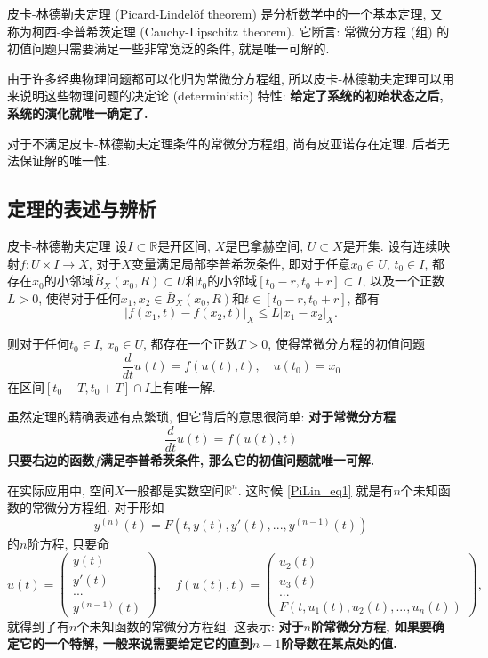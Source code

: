 
皮卡-林德勒夫定理 (Picard-Lindelöf theorem) 是分析数学中的一个基本定理, 又称为柯西-李普希茨定理 (Cauchy-Lipschitz theorem). 它断言: 常微分方程 (组) 的初值问题只需要满足一些非常宽泛的条件, 就是唯一可解的. 

由于许多经典物理问题都可以化归为常微分方程组, 所以皮卡-林德勒夫定理可以用来说明这些物理问题的决定论 (deterministic) 特性: \textbf{给定了系统的初始状态之后, 系统的演化就唯一确定了.}

对于不满足皮卡-林德勒夫定理条件的常微分方程组, 尚有皮亚诺存在定理. 后者无法保证解的唯一性.

\subsection{定理的表述与辨析}
\begin{theorem}{皮卡-林德勒夫定理}
设$I\subset\mathbb{R}$是开区间, $X$是巴拿赫空间, $U\subset X$是开集. 设有连续映射$f:U\times I\to X$, 对于$X$变量满足局部李普希茨条件, 即对于任意$x_0\in U$, $t_0\in I$, 都存在$x_0$的小邻域$\bar B_X(x_0,R)\subset U$和$t_0$的小邻域$[t_0-r,t_0+r]\subset I$, 以及一个正数$L>0$, 使得对于任何$x_1,x_2\in \bar B_X(x_0,R)$和$t\in[t_0-r,t_0+r]$, 都有
$$
|f(x_1,t)-f(x_2,t)|_X\leq L|x_1-x_2|_X.
$$

则对于任何$t_0\in I$, $x_0\in U$, 都存在一个正数$T>0$, 使得常微分方程的初值问题
$$
\frac{d}{dt}u(t)=f(u(t),t),\quad u(t_0)=x_0
$$
在区间$[t_0-T,t_0+T]\cap I$上有唯一解.
\end{theorem}

虽然定理的精确表述有点繁琐, 但它背后的意思很简单: \textbf{对于常微分方程}
\begin{equation}\label{PiLin_eq1}
\frac{d}{dt}u(t)=f(u(t),t)
\end{equation}
\textbf{只要右边的函数$f$满足李普希茨条件, 那么它的初值问题就唯一可解.}

在实际应用中, 空间$X$一般都是实数空间$\mathbb{R}^n$. 这时候 \autoref{PiLin_eq1} 就是有$n$个未知函数的常微分方程组. 对于形如
$$
y^{(n)}(t)=F(t,y(t),y'(t),...,y^{(n-1)}(t))
$$
的$n$阶方程, 只要命
$$
u(t)=\left(\begin{array}{c}
y(t)\\
y'(t)\\
...\\
y^{(n-1)}(t)
\end{array}
\right),\quad
f(u(t),t)=\left(\begin{array}{c}
u_2(t)\\
u_3(t)\\
...\\
F\left(t,u_1(t),u_2(t),...,u_n(t)\right)
\end{array}
\right),
$$
就得到了有$n$个未知函数的常微分方程组. 这表示: \textbf{对于$n$阶常微分方程, 如果要确定它的一个特解, 一般来说需要给定它的直到$n-1$阶导数在某点处的值.}

